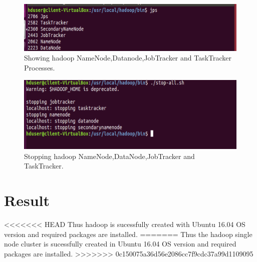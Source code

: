 \documentclass[a4paper,10pt]{article}
\begin{document}
\begin{figure}[h]
	\includegraphics[scale=0.55,center]{exptTwoScreenShot/fig12.png}
	\caption{Showing hadoop NameNode,Datanode,JobTracker and TaskTracker Processes.}
	\label{fig:12}
\end{figure}

\newpage
\begin{figure}[h]
	\includegraphics[scale=0.40,center]{exptTwoScreenShot/fig13.png}
	\caption{Stopping hadoop NameNode,DataNode,JobTracker and TaskTracker.}
\end{figure}


\section{Result}
<<<<<<< HEAD
Thus hadoop is sucessfully created with Ubuntu 16.04 OS version and required packages are installed.
=======
Thus the hadoop single node cluster is sucessfully created in Ubuntu 16.04 OS version and required packages are installed.
>>>>>>> 0c150075a36d56e2086cc7f9cdc37a99d1109095
\end{document}

